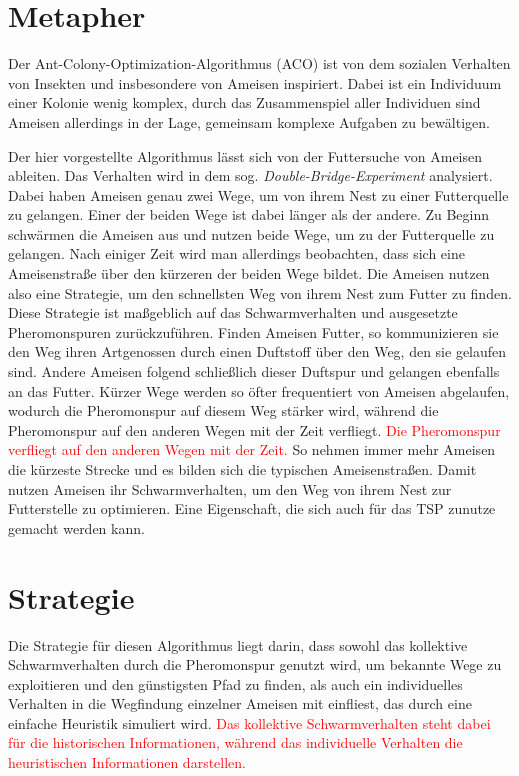 
\section{Metapher}

Der Ant-Colony-Optimization-Algorithmus (ACO) ist von dem sozialen Verhalten
von Insekten und insbesondere von Ameisen inspiriert. Dabei ist ein
Individuum einer Kolonie wenig komplex, durch das Zusammenspiel aller
Individuen sind Ameisen allerdings in der Lage, gemeinsam komplexe Aufgaben
zu bewältigen.

Der hier vorgestellte Algorithmus lässt sich von der Futtersuche von Ameisen
ableiten. Das Verhalten wird in dem sog. \emph{Double-Bridge-Experiment}
analysiert. Dabei haben Ameisen genau zwei Wege, um von ihrem Nest zu einer
Futterquelle zu gelangen. Einer der beiden Wege ist dabei länger als der
andere. Zu Beginn schwärmen die Ameisen aus und nutzen beide Wege, um zu
der Futterquelle zu gelangen. Nach einiger Zeit wird man allerdings
beobachten, dass sich eine Ameisenstraße über den kürzeren der beiden Wege
bildet. Die Ameisen nutzen also eine Strategie, um den schnellsten Weg von
ihrem Nest zum Futter zu finden.
Diese Strategie ist maßgeblich auf das Schwarmverhalten und ausgesetzte
Pheromonspuren zurückzuführen. Finden Ameisen Futter, so kommunizieren sie
den Weg ihren Artgenossen durch einen Duftstoff über den Weg, den sie
gelaufen sind. Andere Ameisen folgend schließlich dieser Duftspur und
gelangen ebenfalls an das Futter. Kürzer Wege werden so öfter frequentiert
von Ameisen abgelaufen, wodurch die Pheromonspur auf diesem Weg stärker wird,
während die Pheromonspur auf den anderen Wegen mit der Zeit verfliegt.
\textcolor{red}{Die Pheromonspur verfliegt auf den anderen Wegen mit der 
Zeit.} So nehmen immer mehr Ameisen die kürzeste Strecke und es bilden sich 
die typischen Ameisenstraßen.
Damit nutzen Ameisen ihr Schwarmverhalten, um den Weg von ihrem Nest zur
Futterstelle zu optimieren. Eine Eigenschaft, die sich auch für das TSP
zunutze gemacht werden kann.

\section{Strategie}

Die Strategie für diesen Algorithmus liegt darin, dass sowohl das kollektive
Schwarmverhalten durch die Pheromonspur genutzt wird, um bekannte Wege zu
exploitieren und den günstigsten Pfad zu finden, als auch ein individuelles
Verhalten in die Wegfindung einzelner Ameisen mit einfliest, das durch eine
einfache Heuristik simuliert wird. \textcolor{red}{Das kollektive 
Schwarmverhalten steht dabei für die historischen Informationen, während das 
individuelle Verhalten die heuristischen Informationen darstellen.}

